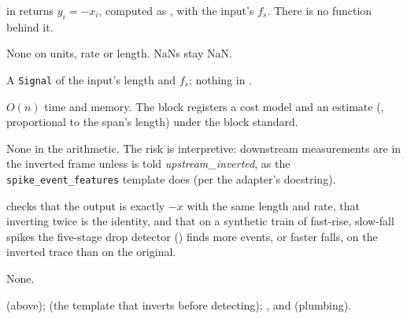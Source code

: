  in  returns $y_i = -x_i$, computed as
, with the input's $f_s$. There is no  function
behind it.

None on units, rate or length. NaNs stay NaN.

A \texttt{Signal} of the input's length and $f_s$; nothing in .

$O(n)$ time and memory. The block registers a cost model and an estimate (,
proportional to the span's length) under the block standard.

None in the arithmetic. The risk is interpretive: downstream measurements are in the inverted
frame unless  is told \emph{upstream\_inverted}, as the
\texttt{spike\_event\_features} template does (per the adapter's docstring).

 checks that the output is exactly $-x$ with the same length
and rate, that inverting twice is the identity, and that on a synthetic train of fast-rise,
slow-fall spikes the five-stage drop detector () finds more events, or
faster falls, on the inverted trace than on the original.

None.

 (above);  (the
template that inverts before detecting); ,
 and  (plumbing).
